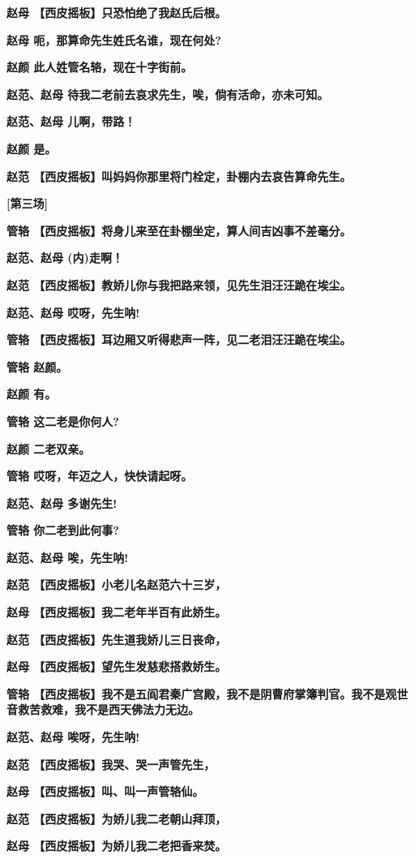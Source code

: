 \textbf{赵母 【西皮摇板】只恐怕绝了我赵氏后根。}

\textbf{赵母 呃，那算命先生姓氏名谁，现在何处?}

\textbf{赵颜 此人姓管名辂，现在十字街前。}

\textbf{赵范、赵母 待我二老前去哀求先生，唉，倘有活命，亦未可知。}

\textbf{赵范、赵母 儿啊，带路！}

\textbf{赵颜 是。}

\textbf{赵范 【西皮摇板】叫妈妈你那里将门栓定，卦棚内去哀告算命先生。}

\textbf{{[}第三场{]}}

\textbf{管辂 【西皮摇板】将身儿来至在卦棚坐定，算人间吉凶事不差毫分。}

\textbf{赵范、赵母 (内)走啊！}

\textbf{赵范 【西皮摇板】教娇儿你与我把路来领，见先生泪汪汪跪在埃尘。}

\textbf{赵范、赵母 哎呀，先生呐!}

\textbf{管辂 【西皮摇板】耳边厢又听得悲声一阵，见二老泪汪汪跪在埃尘。}

\textbf{管辂 赵颜。}

\textbf{赵颜 有。}

\textbf{管辂 这二老是你何人?}

\textbf{赵颜 二老双亲。}

\textbf{管辂 哎呀，年迈之人，快快请起呀。}

\textbf{赵范、赵母 多谢先生!}

\textbf{管辂 你二老到此何事?}

\textbf{赵范、赵母 唉，先生呐!}

\textbf{赵范 【西皮摇板】小老儿名赵范六十三岁，}

\textbf{赵母 【西皮摇板】我二老年半百有此娇生。}

\textbf{赵范 【西皮摇板】先生道我娇儿三日丧命，}

\textbf{赵母 【西皮摇板】望先生发慈悲搭救娇生。}

\textbf{管辂
【西皮摇板】我不是五阎君秦广宫殿，我不是阴曹府掌簿判官。我不是观世音救苦救难，我不是西天佛法力无边。}

\textbf{赵范、赵母 唉呀，先生呐!}

\textbf{赵范 【西皮摇板】我哭、哭一声管先生，}

\textbf{赵母 【西皮摇板】叫、叫一声管辂仙。}

\textbf{赵范 【西皮摇板】为娇儿我二老朝山拜顶，}

\textbf{赵母 【西皮摇板】为娇儿我二老把香来焚。}

